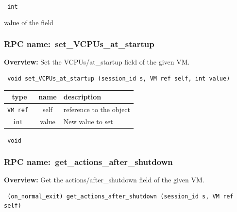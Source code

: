 \vspace{0.3cm}

{\tt 
int
}


value of the field
\vspace{0.3cm}
\vspace{0.3cm}
\vspace{0.3cm}
\subsubsection{RPC name:~set\_VCPUs\_at\_startup}

{\bf Overview:} 
Set the VCPUs/at\_startup field of the given VM.

\begin{verbatim} void set_VCPUs_at_startup (session_id s, VM ref self, int value)\end{verbatim}



 
\vspace{0.3cm}
\begin{tabular}{|c|c|p{7cm}|}
 \hline
{\bf type} & {\bf name} & {\bf description} \\ \hline
{\tt VM ref } & self & reference to the object \\ \hline 

{\tt int } & value & New value to set \\ \hline 

\end{tabular}

\vspace{0.3cm}

{\tt 
void
}



\vspace{0.3cm}
\vspace{0.3cm}
\vspace{0.3cm}
\subsubsection{RPC name:~get\_actions\_after\_shutdown}

{\bf Overview:} 
Get the actions/after\_shutdown field of the given VM.

\begin{verbatim} (on_normal_exit) get_actions_after_shutdown (session_id s, VM ref self)\end{verbatim}


